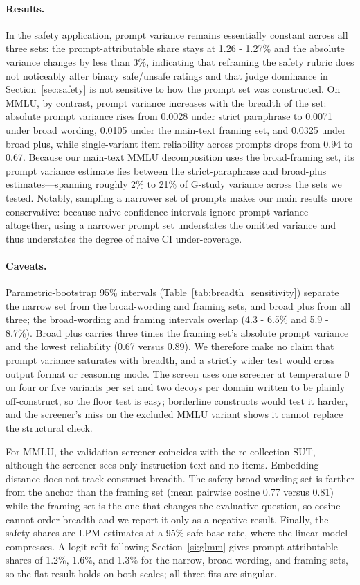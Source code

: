 \paragraph{Results.} In the safety application, prompt variance remains essentially constant across all three sets: the prompt-attributable share stays at 1.26 - 1.27\% and the absolute variance changes by less than 3\%, indicating that reframing the safety rubric does not noticeably alter binary safe/unsafe ratings and that judge dominance in Section~\ref{sec:safety} is not sensitive to how the prompt set was constructed. On MMLU, by contrast, prompt variance increases with the breadth of the set: absolute prompt variance rises from 0.0028 under strict paraphrase to 0.0071 under broad wording, 0.0105 under the main-text framing set, and 0.0325 under broad plus, while single-variant item reliability across prompts drops from 0.94 to 0.67. Because our main-text MMLU decomposition uses the broad-framing set, its prompt variance estimate lies between the strict-paraphrase and broad-plus estimates—spanning roughly 2\% to 21\% of G-study variance across the sets we tested. Notably, sampling a narrower set of prompts makes our main results more conservative: because naive confidence intervals ignore prompt variance altogether, using a narrower prompt set understates the omitted variance and thus understates the degree of naive CI under-coverage.

\paragraph{Caveats.} Parametric-bootstrap 95\% intervals (Table~\ref{tab:breadth_sensitivity}) separate the narrow set from the broad-wording and framing sets, and broad plus from all three; the broad-wording and framing intervals overlap (4.3 - 6.5\% and 5.9 - 8.7\%). Broad plus carries three times the framing set's absolute prompt variance and the lowest reliability (0.67 versus 0.89). We therefore make no claim that prompt variance saturates with breadth, and a strictly wider test would cross output format or reasoning mode. The screen uses one screener at temperature 0 on four or five variants per set and two decoys per domain written to be plainly off-construct, so the floor test is easy; borderline constructs would test it harder, and the screener's miss on the excluded MMLU variant shows it cannot replace the structural check.

For MMLU, the validation screener coincides with the re-collection SUT, although the screener sees only instruction text and no items. Embedding distance does not track construct breadth. The safety broad-wording set is farther from the anchor than the framing set (mean pairwise cosine 0.77 versus 0.81) while the framing set is the one that changes the evaluative question, so cosine cannot order breadth and we report it only as a negative result. Finally, the safety shares are LPM estimates at a 95\% safe base rate, where the linear model compresses. A logit refit following Section~\ref{si:glmm} gives prompt-attributable shares of 1.2\%, 1.6\%, and 1.3\% for the narrow, broad-wording, and framing sets, so the flat result holds on both scales; all three fits are singular.

